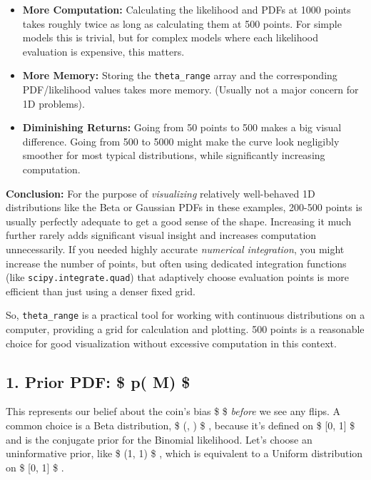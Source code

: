 \documentclass[11pt]{article}
\providecommand{\tightlist}{%
      \setlength{\itemsep}{0pt}\setlength{\parskip}{0pt}}
\begin{document}
\begin{enumerate}
\begin{itemize}
    \begin{itemize}
    \tightlist
    \item
      \textbf{More Computation:} Calculating the likelihood and PDFs at
      1000 points takes roughly twice as long as calculating them at 500
      points. For simple models this is trivial, but for complex models
      where each likelihood evaluation is expensive, this matters.
    \item
      \textbf{More Memory:} Storing the \texttt{theta\_range} array and
      the corresponding PDF/likelihood values takes more memory.
      (Usually not a major concern for 1D problems).
    \item
      \textbf{Diminishing Returns:} Going from 50 points to 500 makes a
      big visual difference. Going from 500 to 5000 might make the curve
      look negligibly smoother for most typical distributions, while
      significantly increasing computation.
    \end{itemize}
  \end{itemize}

  \textbf{Conclusion:} For the purpose of \emph{visualizing} relatively
  well-behaved 1D distributions like the Beta or Gaussian PDFs in these
  examples, 200-500 points is usually perfectly adequate to get a good
  sense of the shape. Increasing it much further rarely adds significant
  visual insight and increases computation unnecessarily. If you needed
  highly accurate \emph{numerical integration}, you might increase the
  number of points, but often using dedicated integration functions
  (like \texttt{scipy.integrate.quad}) that adaptively choose evaluation
  points is more efficient than just using a denser fixed grid.
\end{enumerate}

So, \texttt{theta\_range} is a practical tool for working with
continuous distributions on a computer, providing a grid for calculation
and plotting. 500 points is a reasonable choice for good visualization
without excessive computation in this context.

    \subsection{\texorpdfstring{1. Prior PDF: \$ p(\theta \textbar{} M)
\$}{1. Prior PDF: \$ p(\textbar{} M) \$}}\label{prior-pdf-p-m}

This represents our belief about the coin's bias \$ \theta \$
\emph{before} we see any flips. A common choice is a Beta distribution,
\$ (\alpha, \beta) \$ , because it's defined on \$ {[}0, 1{]}
\$ and is the conjugate prior for the Binomial likelihood. Let's choose
an uninformative prior, like \$ (1, 1) \$ , which is
equivalent to a Uniform distribution on \$ {[}0, 1{]} \$ .
\end{document}
